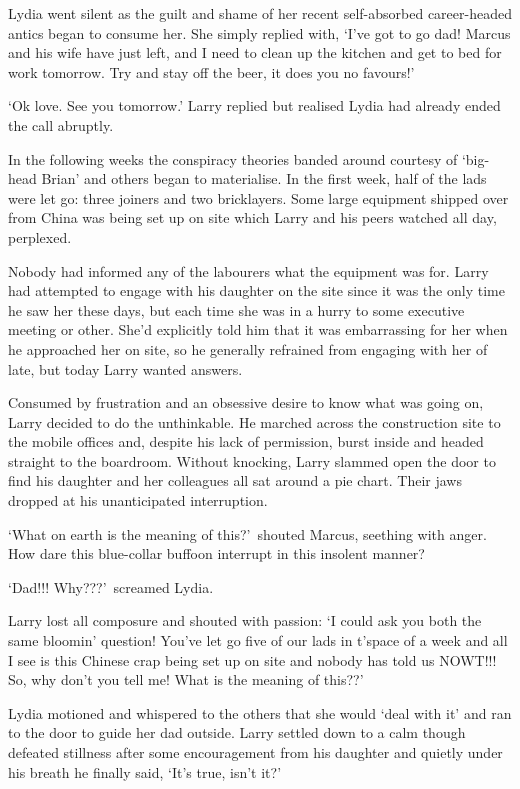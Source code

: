 Lydia went silent as the guilt and shame of her recent self-absorbed
career-headed antics began to consume her.  She simply replied with,
`I've got to go dad! Marcus and his wife have just left, and I need to
clean up the kitchen and get to bed for work tomorrow. Try and stay
off the beer, it does you no favours!'

`Ok love. See you tomorrow.' Larry replied but realised Lydia had
already ended the call abruptly.

In the following weeks the conspiracy theories banded around courtesy
of `big-head Brian' and others began to materialise. In the first
week, half of the lads were let go: three joiners and two
bricklayers. Some large equipment shipped over from China was being
set up on site which Larry and his peers watched all day, perplexed.

Nobody had informed any of the labourers what the equipment was
for. Larry had attempted to engage with his daughter on the site since
it was the only time he saw her these days, but each time she was in a
hurry to some executive meeting or other. She'd explicitly told him
that it was embarrassing for her when he approached her on site, so he
generally refrained from engaging with her of late, but today Larry
wanted answers.

Consumed by frustration and an obsessive desire to know what was going
on, Larry decided to do the unthinkable.  He marched across the
construction site to the mobile offices and, despite his lack of
permission, burst inside and headed straight to the boardroom. Without
knocking, Larry slammed open the door to find his daughter and her
colleagues all sat around a pie chart. Their jaws dropped at his
unanticipated interruption.

`What on earth is the meaning of this?'~shouted Marcus, seething with
anger. How dare this blue-collar buffoon interrupt in this insolent
manner?

`Dad!!! Why???'~screamed Lydia.

Larry lost all composure and shouted with passion: `I could ask you
both the same bloomin' question! You've let go five of our lads in
t'space of a week and all I see is this Chinese crap being set up on
site and nobody has told us NOWT!!! So, why don't you tell me! What is
the meaning of this??'

Lydia motioned and whispered to the others that she would `deal with
it' and ran to the door to guide her dad outside. Larry settled down
to a calm though defeated stillness after some encouragement from his
daughter and quietly under his breath he finally said, `It's true,
isn't it?'

